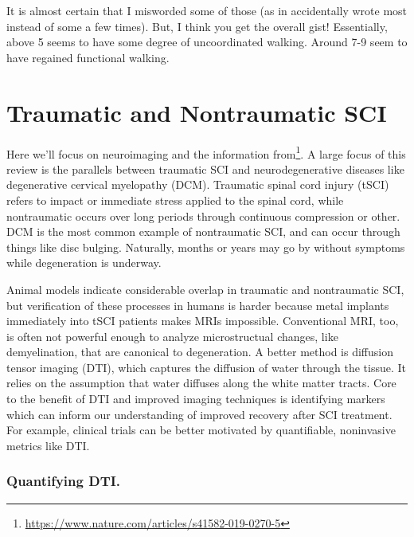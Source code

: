 It is almost certain that I misworded some of those (as in accidentally wrote most instead of some a few times). But, I think you get the overall gist! Essentially, above 5 seems to have some degree of uncoordinated walking. Around 7-9 seem to have regained functional walking. 


\section{Traumatic and Nontraumatic SCI}

\label{sec:TvsnonTSCI}

Here we'll focus on neuroimaging and the information from\footnote{\url{https://www.nature.com/articles/s41582-019-0270-5}}. A large focus of this review is the parallels between traumatic SCI and neurodegenerative diseases like degenerative cervical myelopathy (DCM). Traumatic spinal cord injury (tSCI) refers to impact or immediate stress applied to the spinal cord, while nontraumatic occurs over long periods through continuous compression or other. DCM is the most common example of nontraumatic SCI, and can occur through things like disc bulging. Naturally, months or years may go by without symptoms while degeneration is underway.\newline

Animal models indicate considerable overlap in traumatic and nontraumatic SCI, but verification of these processes in humans is harder because metal implants immediately into tSCI patients makes MRIs impossible. Conventional MRI, too, is often not powerful enough to analyze microstructual changes, like demyelination, that are canonical to degeneration. A better method is diffusion tensor imaging (DTI), which captures the diffusion of water through the tissue. It relies on the assumption that water diffuses along the white matter tracts. Core to the benefit of DTI and improved imaging techniques is identifying markers which can inform our understanding of improved recovery after SCI treatment. For example, clinical trials can be better motivated by quantifiable, noninvasive metrics like DTI. 

\subsubsection{Quantifying DTI.}

